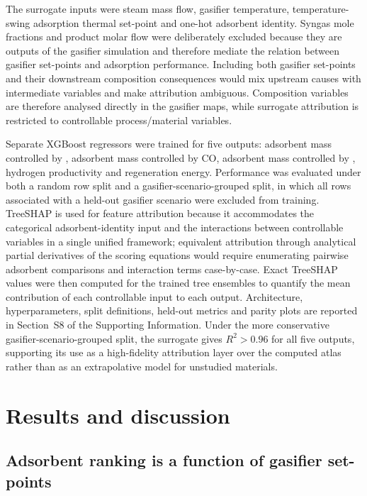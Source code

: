 \documentclass[11pt,a4paper]{article}
\newcommand{\COtwo}{\ce{CO2}}
\newcommand{\CHfour}{\ce{CH4}}
\newcommand{\TSA}{temperature-swing adsorption}
\begin{document}
The surrogate inputs were steam mass flow, gasifier temperature, \TSA{}
thermal set-point and one-hot adsorbent identity. Syngas mole fractions and
product molar flow were deliberately excluded because they are outputs of
the gasifier simulation and therefore mediate the relation between gasifier
set-points and adsorption performance. Including both gasifier set-points
and their downstream composition consequences would mix upstream causes with
intermediate variables and make attribution ambiguous. Composition variables
are therefore analysed directly in the gasifier maps, while surrogate
attribution is restricted to controllable process/material variables.

Separate XGBoost regressors were trained for five outputs: adsorbent mass
controlled by \CHfour{}, adsorbent mass controlled by CO, adsorbent mass
controlled by \COtwo{}, hydrogen productivity and regeneration energy.
Performance was evaluated under both a random row split and a
gasifier-scenario-grouped split, in which all rows associated with a
held-out gasifier scenario were excluded from training. TreeSHAP is used
for feature attribution because it accommodates the categorical
adsorbent-identity input and the interactions between controllable
variables in a single unified framework; equivalent attribution through
analytical partial derivatives of the scoring equations would require
enumerating pairwise adsorbent comparisons and interaction terms
case-by-case. Exact TreeSHAP values were then computed for the trained
tree ensembles to quantify the mean contribution of each controllable
input to each output. Architecture, hyperparameters, split definitions,
held-out metrics and parity plots are reported in Section~S8 of the
Supporting Information. Under the more conservative gasifier-scenario-grouped
split, the surrogate gives $R^2>0.96$ for all five outputs, supporting its use
as a high-fidelity attribution layer over the computed atlas rather than as an
extrapolative model for unstudied materials.


\section{Results and discussion}
\label{sec:results}

\subsection{Adsorbent ranking is a function of gasifier set-points}
\label{sec:ranking}
\end{document}
